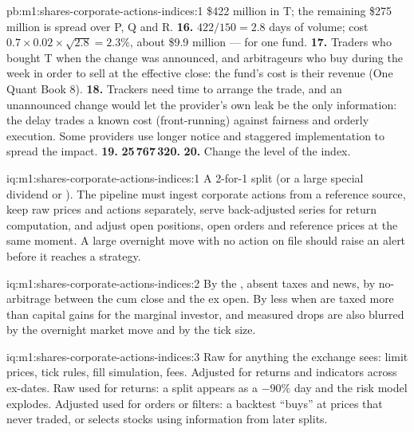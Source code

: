 \begin{solution}{pb:m1:shares-corporate-actions-indices:1}
\$422 million in T; the remaining \$275 million is spread over P, Q and R.
\textbf{16.} $422/150 = 2.8$ days of volume; cost $0.7\times0.02\times
\sqrt{2.8} = 2.3\%$, about \$9.9 million --- for one fund.
\textbf{17.} Traders who bought T when the change was announced, and
arbitrageurs who buy during the week in order to sell at the effective
close: the fund's cost is their revenue (One Quant Book 8).
\textbf{18.} Trackers need time to arrange the trade, and an unannounced
change would let the provider's own leak be the only information: the delay
trades a known cost (front-running) against fairness and orderly execution.
Some providers use longer notice and staggered implementation to spread the
impact.
\textbf{19.} \textbf{25\,767\,320.}
\textbf{20.} Change the level of the index.
\end{solution}

\begin{solution}{iq:m1:shares-corporate-actions-indices:1}
A 2-for-1 split (or a large special dividend or ). The pipeline must
ingest corporate actions from a reference source, keep raw prices and
actions separately, serve back-adjusted series for return computation, and
adjust open positions, open orders and reference prices at the same moment.
A large overnight move with no action on file should raise an alert before
it reaches a strategy.
\end{solution}

\begin{solution}{iq:m1:shares-corporate-actions-indices:2}
By the , absent taxes and news, by no-arbitrage between the cum close
and the ex open. By less when  are taxed more than capital gains
for the marginal investor, and measured drops are also blurred by the
overnight market move and by the tick size.
\end{solution}

\begin{solution}{iq:m1:shares-corporate-actions-indices:3}
Raw for anything the exchange sees: limit prices, tick rules, fill
simulation, fees. Adjusted for returns and indicators across ex-dates. Raw
used for returns: a split appears as a $-90\%$ day and the risk model
explodes. Adjusted used for orders or filters: a backtest ``buys'' at prices
that never traded, or selects stocks using information from later splits.
\end{solution}


